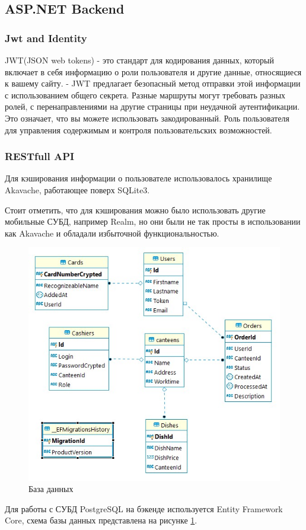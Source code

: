 \documentclass[14pt]{matmex-diploma-custom}
\begin{document}
        \subsection{ASP.NET Backend}
            \subsubsection{Jwt and Identity}
                JWT(JSON web tokens) - это стандарт для кодирования данных, который включает в себя информацию о роли пользователя и другие данные, относящиеся к вашему сайту.
                - JWT предлагает безопасный метод отправки этой информации с использованием общего секрета.
                Разные маршруты могут требовать разных ролей, с перенаправлениями на другие страницы при неудачной аутентификации.
                Это означает, что вы можете использовать закодированный.
                Роль пользователя для управления содержимым и контроля пользовательских возможностей.
    
            \subsubsection{RESTfull API}
                Для кэширования информации о пользователе использовалось хранилище Akavache\cite{akavache_github}, работающее поверх SQLite3.
                
                Стоит отметить, что для кэширования можно было использовать другие мобильные СУБД,
                например Realm, но они были не так просты в использовании как Akavache и обладали избыточной функциональностью.

    \begin{figure}
        \centering
        \includegraphics[scale=0.8]{database_arch1.jpg}
        \caption{База данных}
        \label{db_arch}
    \end{figure}
    Для работы с СУБД PostgreSQL на бэкенде используется Entity Framework Core,
    схема базы данных представлена на рисунке \ref{db_arch}.
\end{document}
